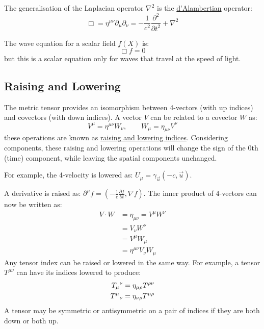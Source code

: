\documentclass[../Main.tex]{subfiles}
\begin{document}
The generalisation of the Laplacian operator $\nabla^2$ is the \underline{d'Alambertian} operator:
\begin{equation*}
    \Box = \eta^{\mu \nu} \partial_\mu \partial_\nu = -\frac{1}{c^2} \frac{\partial^{2}}{\partial t^{2}} + \nabla^2
\end{equation*}

The wave equation for a scalar field $f(X)$ is:
\begin{equation*}
    \Box f = 0
\end{equation*}
but this is a scalar equation only for waves that travel at the speed of light.
\subsection{Raising and Lowering}
The metric tensor provides an isomorphism between 4-vectors (with up indices) and covectors (with down indices). A vector $V$ can be related to a covector $W$ as:
\begin{equation*}
    V^\mu = \eta^{\mu \nu} W_\nu,\qquad W_\mu = \eta_{\mu \nu} V^\nu
\end{equation*}
these operations are known as \underline{raising and lowering indices}. Considering components, these raising and lowering operations will change the sign of the $0$th (time) component, while leaving the spatial components unchanged.

For example, the 4-velocity is lowered as: $U_\mu = \gamma_{\vec{u}} (-c, \vec{u})$.

A derivative is raised as: $\partial^\mu f = \left(-\frac{1}{c} \frac{\partial f}{\partial t}, \nabla f\right)$.
The inner product of 4-vectors can now be written as:
\begin{align*}
    V \cdot W &= \eta_{\mu\nu} = V^\mu W^\nu \\
    &= V_\nu W^\nu \\
    &= V^\mu W_\mu \\
    &= \eta^{\mu \nu} V_\nu W_\mu
\end{align*}
Any tensor index can be raised or lowered in the same way. For example, a tensor $T^{\mu \nu}$ can have its indices lowered to produce:
\begin{align*}
    \indxd{T}{\mu}{\nu} &= \eta_{\mu \rho} T^{\rho \nu} \\
    \indx{T}{\mu}{\nu} &= \eta_{\nu \rho}T^{\mu \rho}
\end{align*}
A tensor may be symmetric or antisymmetric on a pair of indices if they are both down or both up.
\end{document}
